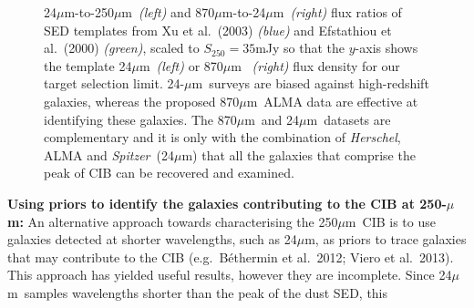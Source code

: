 \documentclass[12pt,a4paper]{article}
\newcommand{\herschel}{{\it Herschel}}
\newcommand{\spitzer}{{\it Spitzer}}
\newcommand{\ea}{et~al.}
\newcommand{\micron}{$\mu$m}
\begin{document}
\begin{figure}
  \caption{ 24\micron-to-250\micron\ {\it (left)} and
      870\micron-to-24\micron\ {\it (right)} flux ratios of SED
      templates from Xu et al.\ (2003) {\it (blue)} and Efstathiou et
      al.\ (2000) {\it (green)}, scaled to $S_{250}=35$mJy so that the $y$-axis shows
      the template 24\micron\ {\it (left)} or 870\micron\ {\it
        (right)} flux density for our target selection
      limit. 24-\micron\ surveys are biased against high-redshift
      galaxies, whereas the proposed 870\micron\ ALMA data are
      effective at identifying these galaxies. The 870\micron\ and
      24\micron\ datasets are complementary and it is only with the combination of \herschel, ALMA and
    \spitzer\ (24\micron) that all the galaxies that comprise the peak of CIB can be
    recovered and examined.}
\label{fig:fromseb}
\end{figure}
{\bf Using priors to identify the galaxies contributing to the CIB
  at 250-\micron:}
%
An alternative approach towards characterising the 250\micron\ CIB is
to use galaxies detected at shorter wavelengths, such as 24\micron, as
priors to trace galaxies that may contribute to the CIB (e.g.\
B\'ethermin et al.\ 2012; Viero et al.\ 2013). This approach has
yielded useful results, however they are incomplete. Since 24\micron\
samples wavelengths shorter than the peak of the dust SED, this
\end{document}
